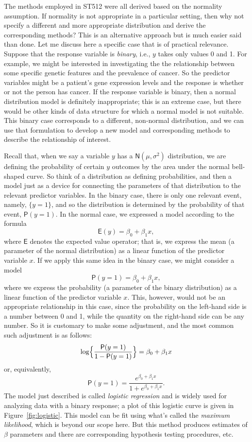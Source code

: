 \documentclass[a4paper, 12pt]{article}
\theoremstyle{plain}
\theoremstyle{definition}
\theoremstyle{remark}
\newcommand{\prob}{\mathsf{P}}
\newcommand{\E}{\mathsf{E}}
\newcommand{\nm}{\mathsf{N}}
\begin{document}
The methods employed in ST512 were all derived based on the normality assumption.  If normality is not appropriate in a particular setting, then why not specify a different and more appropriate distribution and derive the corresponding methods?  This is an alternative approach but is much easier said than done.  Let me discuss here a specific case that is of practical relevance.  Suppose that the response variable is {\em binary}, i.e., $y$ takes only values 0 and 1.  For example, we might be interested in investigating the the relationship between some specific genetic features and the prevalence of cancer.  So the predictor variables might be a patient's gene expression levels and the response is whether or not the person has cancer.  If the response variable is binary, then a normal distribution model is definitely inappropriate; this is an extreme case, but there would be other kinds of data structure for which a normal model is not suitable.  This binary case corresponds to a different, non-normal distribution, and we can use that formulation to develop a new model and corresponding methods to describe the relationship of interest.  

Recall that, when we say a variable $y$ has a $\nm(\mu, \sigma^2)$ distribution, we are defining the probability of certain $y$ outcomes by the area under the normal bell-shaped curve.  So think of a distribution as defining probabilities, and then a model just as a device for connecting the parameters of that distribution to the relevant predictor variables.  In the binary case, there is only one relevant event, namely, $\{y=1\}$, and so the distribution is determined by the probability of that event, $\prob(y=1)$.  In the normal case, we expressed a model according to the formula 
\[ \E(y) = \beta_0 + \beta_1 x, \]
where $\E$ denotes the expected value operator; that is, we express the mean (a parameter of the normal distribution) as a linear function of the predictor variable $x$.  If we apply this same idea in the binary case, we might consider a model 
\[ \prob(y=1) = \beta_0 + \beta_1 x, \]
where we express the probability (a parameter of the binary distribution) as a linear function of the predictor variable $x$.  This, however, would not be an appropriate relationship in this case, since the probability on the left-hand side is a number between 0 and 1, while the quantity on the right-hand side can be any number.  So it is customary to make some adjustment, and the most common such adjustment is as follows:
\[ \log \Bigl\{\frac{\prob(y=1)}{1-\prob(y=1)} \Bigr\} = \beta_0 + \beta_1 x \]
or, equivalently, 
\[ \prob(y=1) = \frac{e^{\beta_0 + \beta_1 x}}{1 + e^{\beta_0 + \beta_1 x}}. \]
The model just described is called {\em logistic regression} and is widely used for analyzing data with a binary response; a plot of this logistic curve is given in Figure~\ref{fig:logistic}.  This model can be fit using what's called the {\em maximum likelihood}, which is beyond our scope here.  But this method produces estimates of $\beta$ parameters and there are corresponding hypothesis testing procedures, etc.  
\end{document}
